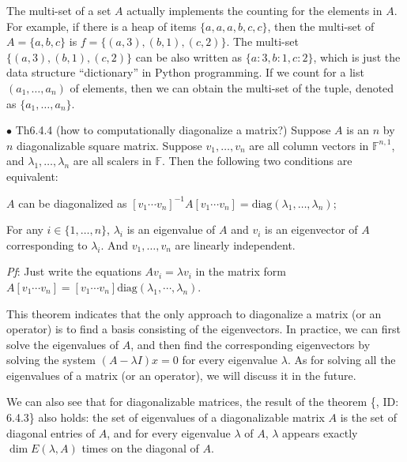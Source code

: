 \documentclass{article}
\begin{document}
\begin{Rmk}{}
    The multi-set of a set $A$ actually implements the counting for the elements in $A$. For example, if there is a heap of items $\{a,a,a,b,c,c\}$, then the multi-set of $A = \{a,b,c\}$ is $f = \{(a, 3), (b, 1), (c, 2)\}$. The multi-set $\{(a, 3), (b, 1), (c, 2)\}$ can be also written as $\{a: 3, b: 1, c: 2\}$, which is just the data structure ``dictionary'' in Python programming.
    \textcolor{Df}{If we count for a list $(a_1, \dots, a_n)$ of elements, then we can obtain the multi-set of the tuple, denoted as $\{a_1, \dots, a_n\}$}.
\end{Rmk}

\begin{Th}{$\bullet$ Th6.4.4 (how to computationally diagonalize a matrix?)}
    Suppose $A$ is an $n$ by $n$ diagonalizable square matrix. Suppose $v_1, \dots, v_n$ are all column vectors in $\mathbb{F}^{n,1}$, and $\lambda_1, \dots, \lambda_n$ are all scalers in $\mathbb{F}$. Then the following two conditions are equivalent:
    \begin{compactenum}
        \item $A$ can be diagonalized as $[v_1 \cdots v_n]^{-1}A[v_1 \cdots v_n] = \text{diag}(\lambda_1, \dots, \lambda_n)$;
        \item For any $i\in\{1,\dots,n\}$, $\lambda_i$ is an eigenvalue of $A$ and $v_i$ is an eigenvector of $A$ corresponding to $\lambda_i$. And $v_1, \dots, v_n$ are linearly independent.
    \end{compactenum}
    \tcblower
    \textit{Pf}: Just write the equations $Av_i = \lambda v_i$ in the matrix form $A[v_1 \cdots v_n] = [v_1 \cdots v_n]\text{diag}(\lambda_1, \cdots, \lambda_n)$.
\end{Th}

\begin{Rmk}{}
    This theorem indicates that the only approach to diagonalize a matrix (or an operator) is to find a basis consisting of the eigenvectors. In practice, we can first solve the eigenvalues of $A$, and then find the corresponding eigenvectors by solving the system $(A-\lambda I)x=0$ for every eigenvalue $\lambda$. As for solving all the eigenvalues of a matrix (or an operator), we will discuss it in the future.

    We can also see that for diagonalizable matrices, the result of the theorem \{, ID: 6.4.3\} also holds: \textcolor{Th}{the set of eigenvalues of a diagonalizable matrix $A$ is the set of diagonal entries of $A$, and for every eigenvalue $\lambda$ of $A$, $\lambda$ appears exactly $\dim E(\lambda, A)$ times on the diagonal of $A$}.
\end{Rmk}
\end{document}
